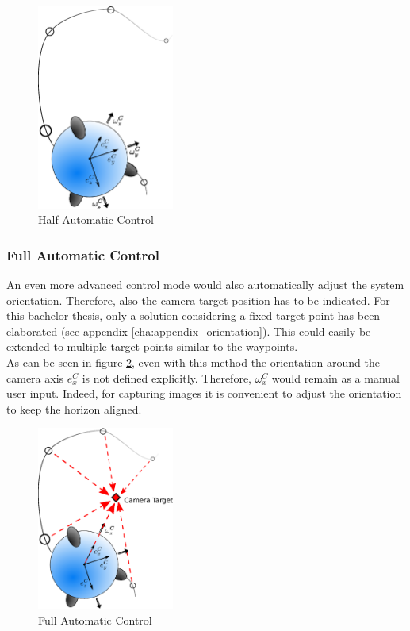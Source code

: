 \begin{figure}[H] %
	\begin{center}
		\includegraphics[width=0.4\textwidth]{HAC.eps}
		\caption[Half automatic control]{Half Automatic Control}  
		\label{fig:half_automatic_control}		
	\end{center}
\end{figure}

\subsubsection{Full Automatic Control}
An even more advanced control mode would also automatically adjust the system orientation. Therefore, also the camera target position has to be indicated. For this bachelor thesis, only a solution considering a fixed-target point has been elaborated (see appendix \ref{cha:appendix_orientation}). This could easily be extended to multiple target points similar to the waypoints. \\ As can be seen in figure \ref{fig:full_automatic_control}, even with this method the orientation around the camera axis $e_x^C$ is not defined explicitly. Therefore, $\omega_x^C$ would remain as a manual user input. Indeed, for capturing images it is convenient to adjust the orientation to keep the horizon aligned.


\begin{figure}[H] %
	\begin{center}
		\includegraphics[width=0.4\textwidth]{FAComega.eps}
		\caption[Full automatic control]{Full Automatic Control}  
		\label{fig:full_automatic_control}		
	\end{center}
\end{figure}